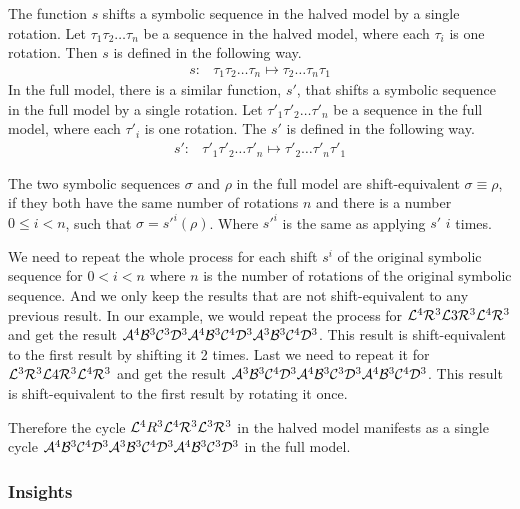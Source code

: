 \begin{definition}
	The function $s$ shifts a symbolic sequence in the halved model by a single rotation.
	Let $\tau_1\tau_2 \dots \tau_n$ be a sequence in the halved model, where each $\tau_i$ is one rotation.
	Then $s$ is defined in the following way.
	\begin{align}
		s: & \tau_1\tau_2 \dots \tau_n \mapsto \tau_2 \dots \tau_n\tau_1
	\end{align}
	In the full model, there is a similar function, $s'$, that shifts a symbolic sequence in the full model by a single rotation.
	Let $\tau'_1\tau'_2 \dots \tau'_n$ be a sequence in the full model, where each $\tau'_i$ is one rotation.
	The $s'$ is defined in the following way.
	\begin{align}
		s': & \tau'_1\tau'_2 \dots \tau'_n \mapsto \tau'_2 \dots \tau'_n\tau'_1
	\end{align}
\end{definition}

\begin{definition}
	The two symbolic sequences $\sigma$ and $\rho$ in the full model are shift-equivalent $\sigma \equiv \rho$,
	if they both have the same number of rotations $n$
	and there is a number $0 \leq i < n$, such that $\sigma = s'^i(\rho)$.
	Where $s'^i$ is the same as applying $s'$ $i$ times.
\end{definition}

We need to repeat the whole process for each shift $s^i$ of the original symbolic sequence for $0 < i < n$ where $n$ is the number of rotations of the original symbolic sequence.
And we only keep the results that are not shift-equivalent to any previous result.
In our example, we would repeat the process for $\mathcal{L}^4\mathcal{R}^3\mathcal{L}3\mathcal{R}^3\mathcal{L}^4\mathcal{R}^3$ and get the result $\mathcal{A}^4\mathcal{B}^3\mathcal{C}^3\mathcal{D}^3\mathcal{A}^4\mathcal{B}^3\mathcal{C}^4\mathcal{D}^3\mathcal{A}^3\mathcal{B}^3\mathcal{C}^4\mathcal{D}^3$.
This result is shift-equivalent to the first result by shifting it 2 times.
Last we need to repeat it for $\mathcal{L}^3\mathcal{R}^3\mathcal{L}4\mathcal{R}^3\mathcal{L}^4\mathcal{R}^3$ and get the result $\mathcal{A}^3\mathcal{B}^3\mathcal{C}^4\mathcal{D}^3\mathcal{A}^4\mathcal{B}^3\mathcal{C}^3\mathcal{D}^3\mathcal{A}^4\mathcal{B}^3\mathcal{C}^4\mathcal{D}^3$.
This result is shift-equivalent to the first result by rotating it once.

Therefore the cycle $\mathcal{L}^4R^3\mathcal{L}^4\mathcal{R}^3\mathcal{L}^3\mathcal{R}^3$ in the halved model manifests as a single cycle $\mathcal{A}^4\mathcal{B}^3\mathcal{C}^4\mathcal{D}^3\mathcal{A}^3\mathcal{B}^3\mathcal{C}^4\mathcal{D}^3\mathcal{A}^4\mathcal{B}^3\mathcal{C}^3\mathcal{D}^3$ in the full model.

\subsubsection{Insights}

